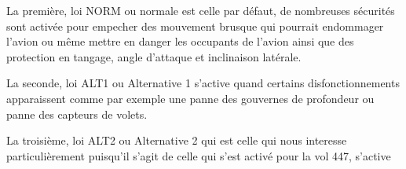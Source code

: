         La première, loi NORM ou normale est celle par défaut, de nombreuses sécurités sont activée pour empecher 
        des mouvement brusque qui pourrait endommager l'avion ou même mettre en danger 
        les occupants de l'avion ainsi que des protection en tangage, angle d'attaque et inclinaison 
        latérale.

        La seconde, loi ALT1 ou Alternative 1 s'active quand certains disfonctionnements apparaissent
        comme par exemple une panne des gouvernes de profondeur ou panne des capteurs de volets.

        La troisième, loi ALT2 ou Alternative 2 qui est celle qui nous interesse particulièrement 
        puisqu'il s'agit de celle qui s'est activé pour la vol 447, s'active  
        
        










        



        
        




